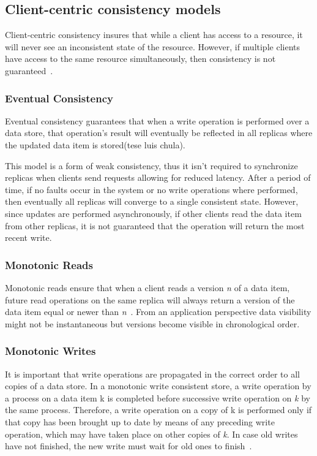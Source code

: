 \subsection{Client-centric consistency models}
\label{sec:client_centric_consistency_models}
Client-centric consistency insures that while a client has access to a resource, it will never see an inconsistent state of the resource. However, if multiple clients have access to the same resource simultaneously, then consistency is not guaranteed~\cite{consistency-models}.

\subsubsection{Eventual Consistency}
\label{sec:eventual_consistency}

Eventual consistency guarantees that when a write operation is performed over a data store, that operation’s result will eventually be reflected in all replicas where the updated data item is stored(tese luis chula). 

This model is a form of weak consistency, thus it isn’t required to synchronize replicas when clients send requests allowing for reduced latency. After a period of time, if no faults occur in the system or no write operations where performed, then eventually all replicas will converge to a single consistent state. However, since updates are performed asynchronously, if other clients read the data item from other replicas, it is not guaranteed that the operation will return the most recent write.

\subsubsection{Monotonic Reads}
\label{sec:monotonic_reads}

Monotonic reads ensure that when a client reads a version \textit{n} of a data item, future read operations on the same replica will always return a version of the data item equal or newer than \textit{n}~\cite{consistency-in-distributed-systems}. From an application perspective data visibility might not be instantaneous but versions become visible in chronological order. 

\subsubsection{Monotonic Writes}
\label{sec:monotonic_writes}

It is important that write operations are propagated in the correct order to all copies of a data store. In a monotonic write consistent store, a write operation by a process on a data item k is completed before successive write operation on \textit{k} by the same process. Therefore, a write operation on a copy of k is performed only if that copy has been brought up to date by means of any preceding write operation, which may have taken place on other copies of \textit{k}. In case old writes have not finished, the new write must wait for old ones to finish~\cite{distributed-systems-principles-paradigms}.

